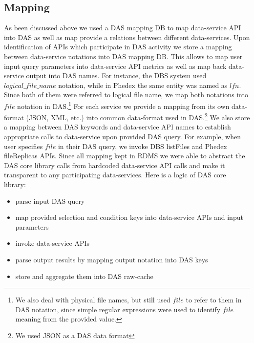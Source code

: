 \documentclass[a4paper]{jpconf}
\begin{document}
\subsection{Mapping}
As been discussed above we used a DAS mapping DB to map data-service API into
DAS as well as map provide a relations between different data-services.
Upon identification of APIs which participate in DAS activity 
we store a mapping between data-service notations
into DAS mapping DB. This allows to map user input query parameters into
data-service API metrics as well as map back data-service output into DAS names.
For instance, the DBS system used $logical\_file\_name$ notation, while in Phedex
the same entity was named as $lfn$. Since both of them were referred to
logical file name, we map both notations into $file$ notation in DAS.\footnote{We
also deal with physical file names, but still used $file$ to refer to them in
DAS notation, since simple regular expressions were used to identify $file$
meaning from the provided value.}
For each service we provide a mapping from its own data-format (JSON, XML, etc.) into
common data-format used in DAS.\footnote{We used JSON as a DAS data format}
We also store a mapping between DAS keywords and data-service API names to
establish appropriate calls to data-service upon provided DAS query. For example,
when user specifies $file$ in their DAS query, we invoke DBS listFiles and Phedex
fileReplicas APIs. Since all mapping kept in RDMS we were able to abstract the 
DAS core library calls from hardcoded data-service API calls and make it
transparent to any participating data-services. Here is a logic of DAS core
library:
\begin{itemize}
\item parse input DAS query
\item map provided selection and condition keys into data-service APIs and
input parameters
\item invoke data-service APIs
\item parse output results by mapping output notation into DAS keys
\item store and aggregate them into DAS raw-cache
\end{itemize} 
\end{document}
